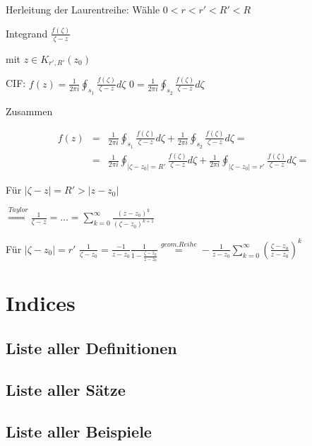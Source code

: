 \documentclass[10pt,a4paper]{article}
\begin{document}
Herleitung der Laurentreihe: Wähle $0<r<r'<R'<R$

Integrand $\frac{f(\zeta)}{\zeta-z}$

mit $z \in K_{r',R'}(z_0)$

CIF: $f(z) = \frac{1}{2 \pi i} \oint_{s_1} \frac{f(\zeta)}{\zeta-z} d\zeta$
$0 = \frac{1}{2 \pi i} \oint_{s_2} \frac{f(\zeta)}{\zeta-z} d\zeta$

Zusammen

\begin{eqnarray*}
f(z) &=& \frac{1}{2 \pi i} \oint_{s_1} \frac{f(\zeta)}{\zeta-z} d\zeta + \frac{1}{2 \pi i} \oint_{s_2} \frac{f(\zeta)}{\zeta-z} d\zeta = \\
 &=& \frac{1}{2 \pi i} \oint_{|\zeta - z_0| = R'} \frac{f(\zeta)}{\zeta-z} d\zeta + \frac{1}{2 \pi i} \oint_{|\zeta - z_0|=r'} \frac{f(\zeta)}{\zeta-z} d\zeta =
\end{eqnarray*}

Für $|\zeta-z|=R' > |z-z_0|$

$\stackrel{Taylor}{\Rightarrow} \frac{1}{\zeta-z} =  \ldots = \sum_{k=0}^{\infty} \frac{(z-z_0)^{k}}{(\zeta-z_0)^{k+1}}$

Für $|\zeta-z_0|=r'$
$\frac{1}{\zeta-z_0}=\frac{-1}{z-z_0} \frac{1}{1-\frac{\zeta-z_0}{z-z_0}} \stackrel{geom. Reihe}{=} - \frac{1}{z-z_0} \sum_{k=0}^{\infty} \left( \frac{\zeta - z_0}{z-z_0}\right)^{k}$
\newpage

\section{Indices}

\subsection{Liste aller Definitionen}

\subsection{Liste aller Sätze}

\subsection{Liste aller Beispiele}
\end{document}
